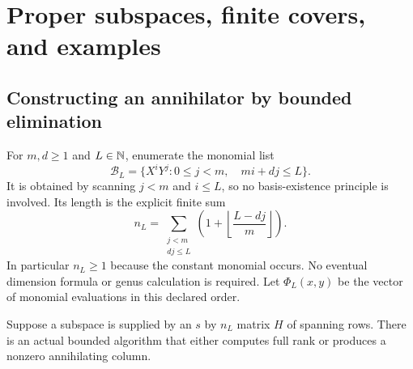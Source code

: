 \section{Proper subspaces, finite covers, and examples}
\label{sec:applications}

\subsection{Constructing an annihilator by bounded elimination}

For $m,d\ge1$ and $L\in\mathbb N$, enumerate the monomial list
\[
 \mathcal B_L=\{X^iY^j:0\le j<m,\quad mi+dj\le L\}.
\]
It is obtained by scanning $j<m$ and $i\le L$, so no basis-existence principle is involved. Its length is the explicit finite sum
\[
 n_L=\sum_{\substack{j<m\\dj\le L}}
       \left(1+\left\lfloor\frac{L-dj}{m}\right\rfloor\right).
\]
In particular $n_L\ge1$ because the constant monomial occurs. No eventual dimension formula or genus calculation is required. Let $\Phi_L(x,y)$ be the vector of monomial evaluations in this declared order.

Suppose a subspace is supplied by an $s$ by $n_L$ matrix $H$ of spanning rows. There is an actual bounded algorithm that either computes full rank or produces a nonzero annihilating column.

